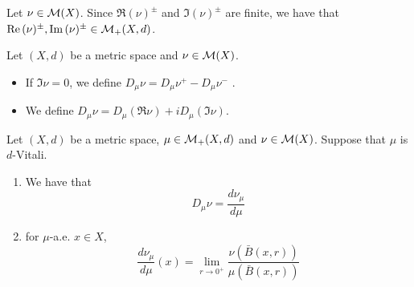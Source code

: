 \documentclass{book}
\begin{document}
	\begin{note}
		Let $\nu \in \mathcal{M}(X)$. Since $\Re(\nu)^{\pm}$ and $\Im(\nu)^{\pm}$ are finite, we have that $\text{Re} \,(\nu)^{\pm}, \text{Im} \,(\nu)^{\pm} \in \mathcal{M}_+(X, d)$.
	\end{note}
	
	\begin{defn} 
		Let $(X, d)$ be a metric space and $\nu \in \mathcal{M}(X)$.
		\begin{itemize}
			\item If $\Im \nu = 0$, we define $D_{\mu} \nu = D_{\mu} \nu^+ - D_{\mu} \nu^-$ .
			\item We define $D_{\mu} \nu = D_{\mu} (\Re \nu) + i D_{\mu} (\Im \nu)$.
		\end{itemize}
	\end{defn}

	\begin{ex} 
		Let $(X, d)$ be a metric space, $\mu \in \mathcal{M}_+(X, d)$ and $\nu \in \mathcal{M}(X)$. Suppose that $\mu$ is $d$-Vitali.  
		\begin{enumerate}
			\item We have that 
			$$D_{\mu} \nu = \frac{d\nu_{\mu}}{d\mu}$$
			\item for $\mu$-a.e. $x \in X$, 
			$$\frac{d\nu_{\mu}}{d\mu}(x) = \lim_{r \rightarrow 0^+} \frac{ \nu(\bar{B}(x, r))}{\mu(\bar{B}(x, r))}$$
		\end{enumerate}
	\end{ex}
\end{document}
